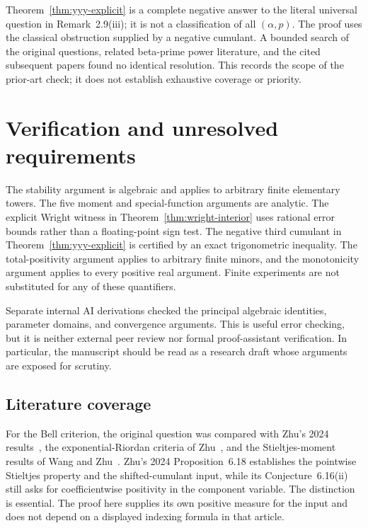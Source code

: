 \documentclass[11pt,a4paper]{article}
\theoremstyle{definition}
\theoremstyle{remark}
\numberwithin{equation}{section}
\begin{document}
Theorem~\ref{thm:yyy-explicit} is a complete negative answer to the
literal universal question in Remark~2.9(iii); it is not a classification
of all $(\alpha,p)$. The proof uses the classical obstruction supplied
by a negative cumulant. A bounded search of the original questions,
related beta-prime power literature, and the cited subsequent papers
found no identical resolution. This records the scope of the prior-art
check; it does not establish exhaustive coverage or priority.


\section{Verification and unresolved requirements}
\label{sec:status}

The stability argument is algebraic and applies to arbitrary finite
elementary towers. The five moment and special-function arguments are analytic. The explicit Wright witness in
Theorem~\ref{thm:wright-interior} uses rational error bounds rather than a
floating-point sign test. The negative third cumulant in
Theorem~\ref{thm:yyy-explicit} is certified by an exact trigonometric
inequality. The total-positivity argument applies to arbitrary finite
minors, and the monotonicity argument applies to every positive real
argument. Finite experiments are not substituted for any of these
quantifiers.

Separate internal AI derivations checked the principal algebraic identities,
parameter domains, and convergence arguments. This is useful error checking,
but it is neither external peer review nor formal proof-assistant
verification. In particular, the manuscript should be read as a research
draft whose arguments are exposed for scrutiny.

\subsection{Literature coverage}

For the Bell criterion, the original question was compared with
Zhu's 2024 results~\cite{Zhu2024}, the exponential-Riordan criteria of
Zhu~\cite{Zhu2021}, and the Stieltjes-moment results of Wang and
Zhu~\cite{WangZhu2016}. Zhu's 2024 Proposition~6.18 establishes the
pointwise Stieltjes property and the shifted-cumulant input, while its
Conjecture~6.16(ii) still asks for coefficientwise positivity in the
component variable. The distinction is essential. The proof here supplies
its own positive measure for the input and does not depend on a displayed
indexing formula in that article.
\end{document}
